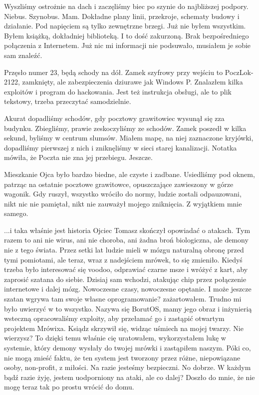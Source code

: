 Wyszliśmy ostrożnie na dach i zaczęliśmy biec po szynie do najbliższej podpory.
Niebus. Szynobus. Mam. Dokładne plany linii, przekroje, schematy budowy i działanie.
Pod napięciem są tylko zewnętrzne brzegi.
Już nie byłem wszystkim. Byłem książką, dokładniej biblioteką. I to dość zakurzoną.
Brak bezpośredniego połączenia z Internetem. Już nic mi informacji nie podsuwało, musiałem je sobie sam znaleźć.

Przęsło numer 23, będą schody na dół. Zamek szyfrowy przy wejściu to PoczLok-2122, zamknięty, ale zabezpieczenia dziurawe jak Windows P. 
Znalazłem kilka exploitów i program do hackowania. Jest też instrukcja obsługi, ale to plik tekstowy, trzeba przeczytać samodzielnie.

Akurat dopadliśmy schodów, gdy pocztowy grawitowiec wysunął się zza budynku. 
Zbiegliśmy, prawie zeskoczyliśmy ze schodów. Zamek poszedł w kilka sekund, byliśmy w centrum slumsów.
Miałem mapę, na niej zaznaczone kryjówki, dopadliśmy pierwszej z nich i zniknęliśmy w sieci starej kanalizacji.
Notatka mówiła, że Poczta nie zna jej przebiegu. Jeszcze.

\divider{}

Mieszkanie Ojca było bardzo biedne, ale czyste i zadbane.
Usiedliśmy pod oknem, patrząc na ostatnie pocztowe grawitowce, opuszczające zawieszony w górze wagonik.
Gdy ruszył, wszystko wróciło do normy, ludzie zostali odpauzowani, nikt nic nie pamiętał, nikt nie zauważył mojego zniknięcia.
Z wyjątkiem mnie samego.

\begin{dialogue}
\ds{} ...i taka właśnie jest historia \dm{} Ojciec Tomasz skończył opowiadać o atakach. \dm{}
Tym razem to ani nie wirus, ani nie choroba, ani żadna broń biologiczna, ale demony nie z tego świata.
Przez setki lat ludzie mieli w mózgu naturalną obronę przed tymi pomiotami, ale teraz, wraz z nadejściem mrówek, to się zmieniło.
Kiedyś trzeba było interesować się voodoo, odprawiać czarne msze i wróżyć z kart, aby zaprosić szatana do siebie.
Dzisiaj sam wchodzi, atakując chip przez połączenie internetowe i dalej mózg. Nowoczesne czasy, nowoczesne opętanie.
\ds{} I może jeszcze szatan wgrywa tam swoje własne oprogramowanie? \dm{} zażartowałem. Trudno mi było uwierzyć w to wszystko.
\ds{} Nazywa się BorutOS, mamy jego obraz i inżynierią wsteczną opracowaliśmy exploity, aby przełamać go i zastąpić otwartym projektem Mrówixa. \dm{}
Ksiądz skrzywił się, widząc uśmiech na mojej twarzy. \dm{} Nie wierzysz? To dzięki temu właśnie cię uratowałem, wykorzystałem lukę w systemie, który
demony wysłały do twojej mrówki i zastąpiłem naszym. Póki co, nie mogą znieść faktu, że ten system jest tworzony przez różne, niepowiązane osoby, non-profit, z miłości.
Na razie jesteśmy bezpieczni.
\ds{} No dobrze. W każdym bądź razie żyję, jestem uodporniony na ataki, ale co dalej? \dm{} Doszło do mnie, że nie mogę teraz tak po prostu wrócić do domu.
\end{dialogue}

